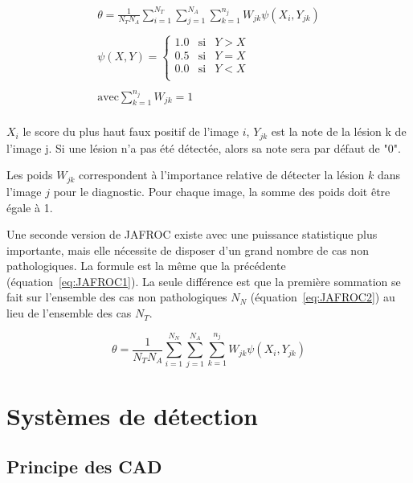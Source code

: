 \begin{equation}
\label{eq:JAFROC1}
\begin{array}{l}
	\displaystyle \theta=\frac{1}{N_T N_A} \sum_{i=1}^{N_T} \sum_{j=1}^{N_A} \sum_{k=1}^{n_j} W_{jk} \psi(X_i, Y_{jk}) \\
	\\
	\displaystyle \psi(X,Y) = \left\{
		\begin{array}{lll}
			1.0 & \mbox{si} & Y > X \\
			0.5 & \mbox{si} & Y = X    \\
			0.0 & \mbox{si} & Y < X    \\
		\end{array}
	\right. \\
	\\
	\displaystyle \mbox{avec} \sum_{k=1}^{n_j} W_{jk} = 1 \\
\end{array}
\end{equation}

$X_i$ le score du plus haut faux positif de l'image $i$, $Y_{jk}$ est la note de la lésion k de l'image j. Si une lésion n'a pas été détectée, alors sa note sera par défaut de "0".

Les poids $W_{jk}$ correspondent à l'importance relative de détecter la lésion $k$ dans l'image $j$ pour le diagnostic. Pour chaque image, la somme des poids doit être égale à 1.

Une seconde version de JAFROC existe avec une puissance statistique plus importante, mais elle nécessite de disposer d'un grand nombre de cas non pathologiques. La formule est la même que la précédente (équation~\ref{eq:JAFROC1}). La seule différence est que la première sommation se fait sur l'ensemble des cas non pathologiques $N_N$ (équation~\ref{eq:JAFROC2}) au lieu de l'ensemble des cas $N_T$.

\begin{equation}
\label{eq:JAFROC2}
\theta=\frac{1}{N_T N_A} \sum_{i=1}^{N_N} \sum_{j=1}^{N_A} \sum_{k=1}^{n_j} W_{jk} \psi(X_i, Y_{jk})
\end{equation}


\chapter{Systèmes de détection}

\section{Principe des CAD}

